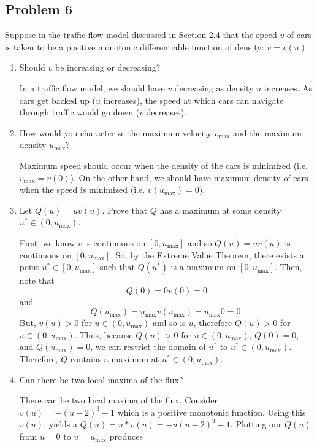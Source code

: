 \documentclass[a4paper,12pt]{article}
\begin{document}
\subsection*{Problem 6}
	Suppose in the traffic flow model discussed in Section 2.4 that the speed $ v $ of cars is taken to be a positive monotonic differentiable function of density: $ v = v(u) $
	\begin{enumerate}[label = \textbf{(\alph*)}]
		\item Should $ v $ be increasing or decreasing?
		
		In a traffic flow model, we should have $ v $ decreasing as density $ u $ increases. As cars get backed up ($ u $ increases), the speed at which cars can navigate through traffic would go down ($ v $ decreases).
		
		\item How would you characterize the maximum velocity $ v_\text{max} $ and the maximum density $ u_\text{max} $?
		
		Maximum speed should occur when the density of the cars is minimized (i.e. $ v_{\text{max}} = v(0) $). On the other hand, we should have maximum density of cars when the speed is minimized (i.e. $ v(u_\text{max}) = 0 $).
		
		\item Let $ Q(u) = u v(u) $. Prove that $ Q $ has a maximum at some density $ u^* \in (0,u_\text{max})$.
		
		First, we know $ v $ is continuous on $ [0, u_\text{max}] $ and so $ Q(u) = u v(u) $ is continuous on $ [0, u_\text{max}] $. So, by the Extreme Value Theorem, there exists a point $ u^* \in [0,u_\text{max}] $ such that $ Q(u^*) $ is a maximum on $ [0, u_\text{max}] $. Then, note that 
		\[
			Q(0) = 0 v(0) = 0
		\]
		and
		\[
			Q(u_\text{max})  = u_\text{max} v(u_\text{max}) = u_\text{max} 0 = 0.
		\]
		 But, $ v(u) > 0$ for $ u \in (0, u_\text{max}) $ and so is $ u $, therefore $ Q(u) > 0 $ for $ u \in (0, u_\text{max}) $. Thus, because $ Q(u) > 0 $ for $u \in (0, u_\text{max})$, $ Q(0) = 0 $, and $ Q(u_\text{max}) = 0 $, we can restrict the domain of $ u^* $ to $ u^* \in (0, u_\text{max}) $. Therefore, $ Q $ contains a maximum at $u^* \in (0, u_\text{max})$.
         
         \newpage
		
		\item Can there be two local maxima of the flux?
        
        There can be two local maxima of the flux. Consider $ v(u) = -(u - 2)^3 + 1 $ which is a positive monotonic function. Using this $ v(u) $, yields a $ Q(u) = u*v(u) =  -u(u - 2)^3 + 1 $. Plotting our $ Q(u) $ from $ u = 0 $ to $ u = u_\text{max} $ produces
        

\end{enumerate}
\end{document}
